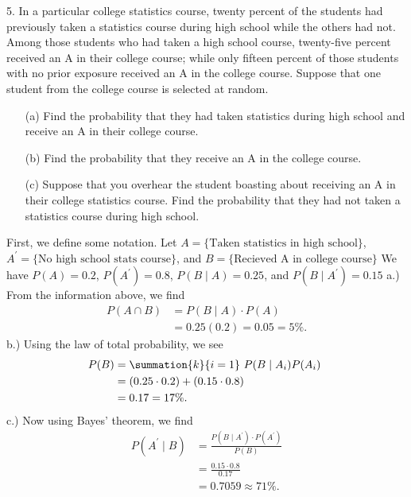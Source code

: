 \documentclass{report}
\begin{document}
    \pagebreak \bigbreak \noindent 
    \begin{mdframed}
        5. In a particular college statistics course, twenty percent of the students had previously taken a statistics course during high school while the others had not. Among those students who had taken a high school course, twenty-five percent received an A in their college course; while only fifteen percent of those students with no prior exposure received an A in the college course. Suppose that one student from the college course is selected at random.
        \begin{itemize}
            \item[(a)] Find the probability that they had taken statistics during high school and receive an A in their college course.
            \item[(b)] Find the probability that they receive an A in the college course.
            \item[(c)] Suppose that you overhear the student boasting about receiving an A in their college statistics course. Find the probability that they had not taken a statistics course during high school.
        \end{itemize}
    \end{mdframed}
    \bigbreak \noindent 
    First, we define some notation. Let $A = \{ \text{Taken statistics in high school} \}$,  \\
    $A^{\prime} =\{ \text{No high school stats course} \} $, and $B = \{ \text{Recieved A in college course} \} $
    \bigbreak \noindent 
    We have $P(A) = 0.2 $, $P(A^{\prime})  = 0.8$, $P(B \mid A) = 0.25 $, and $P(B \mid A^{\prime}) = 0.15$
    \bigbreak \noindent 
    a.) From the information above, we find
    \begin{align*}
        P(A \cap B) &= P(B\mid A) \cdot P(A) \\
        &=0.25(0.2) = 0.05 = 5\%
    .\end{align*}
    \bigbreak \noindent 
    b.) Using the law of total probability, we see
    \begin{align*}
        P(B) &= \summation{k}{i=1}\ P(B\mid A_{i})P(A_{i})\ \\
        &= (0.25 \cdot 0.2) + (0.15 \cdot 0.8) \\
        &=0.17 = 17\%
    .\end{align*}
    \bigbreak \noindent 
    c.)  Now using Bayes' theorem, we find
    \begin{align*}
        P(A^{\prime} \mid B) &= \frac{P(B\mid A^{\prime}) \cdot P(A^{\prime})}{P(B)} \\
        &=\frac{0.15 \cdot 0.8}{0.17} \\
        &=0.7059 \approx 71\%
    .\end{align*}
\end{document}
